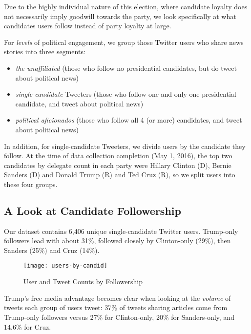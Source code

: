 Due to the highly individual nature of this election, where candidate loyalty does not necessarily imply goodwill towards the party, we look specifically at what candidates users follow instead of party loyalty at large. 

For \emph{levels} of political engagement, we group those Twitter users who share news stories into three segments: 

\begin{itemize}
  \item \emph{the unaffiliated} (those who follow no presidential candidates, but do tweet about political news)
  \item \emph{single-candidate} Tweeters (those who follow one and only one presidential candidate, and tweet about political news)
  \item \emph{political aficionados} (those who follow all 4 (or more) candidates, and tweet about political news)
\end{itemize}

In addition, for single-candidate Tweeters, we divide users by the candidate they follow. At the time of data collection completion (May 1, 2016), the top two candidates by delegate count in each party were Hillary Clinton (D), Bernie Sanders (D) and Donald Trump (R) and Ted Cruz (R), so we split users into these four groups. 


\subsection{A Look at Candidate Followership}

Our dataset contains 6,406 unique single-candidate Twitter users. Trump-only followers lead with about 31\%, followed closely by Clinton-only (29\%), then Sanders (25\%) and Cruz (14\%).

\begin{figure}[H] 
\centering 
 \texttt{[image: users-by-candid]}   
  \caption{User and Tweet Counts by Followership
    \label{fig:weets-by-candid}}
\end{figure}

Trump's free media advantage becomes clear when looking at the \emph{volume} of tweets each group of users tweet: 37\% of tweets sharing articles come from Trump-only followers versus 27\% for Clinton-only, 20\% for Sanders-only, and 14.6\% for Cruz.

